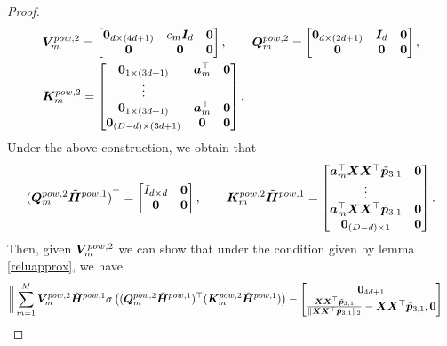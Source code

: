 \begin{proof}
    \begin{align*}
        &\boldsymbol{V}_{m}^{pow,2}=\begin{bmatrix}
            \boldsymbol{0}_{d\times (4d+1)}&c_m\boldsymbol{I}_d&\boldsymbol{0}\\
            \boldsymbol{0}&\boldsymbol{0}&\boldsymbol{0}
        \end{bmatrix},\qquad\boldsymbol{Q}_{m}^{pow,2}=\begin{bmatrix}
            \boldsymbol{0}_{d\times(2d+1)}&\boldsymbol{I}_{d}&\boldsymbol{0}\\
            \boldsymbol{0}&\boldsymbol{0}&\boldsymbol{0}
        \end{bmatrix},\\
        &\boldsymbol{K}_m^{pow,2}=\begin{bmatrix}
            \boldsymbol{0}_{1\times (3d+1)}&\boldsymbol{a}_m^\top&\boldsymbol{0}\\
            \vdots\\
            \boldsymbol{0}_{1\times(3d+1)}&\boldsymbol{a}_m^\top&\boldsymbol{0}\\
            \boldsymbol{0}_{(D-d)\times(3d+1)}&\boldsymbol{0}&\boldsymbol{0}
        \end{bmatrix}.
    \end{align*}
    Under the above construction, we obtain that
    \begin{align*}
        (\boldsymbol{Q}_m^{pow,2}\tilde{\boldsymbol{H}}^{pow,1})^\top =\begin{bmatrix}
            I_{d\times d}&\boldsymbol{0}\\
            \boldsymbol{0}&\boldsymbol{0}
        \end{bmatrix},\qquad \boldsymbol{K}_m^{pow,2}\tilde{\boldsymbol{H}}^{pow,1} = \begin{bmatrix}
            \boldsymbol{a}_m^\top\boldsymbol{X}\boldsymbol{X}^\top\tilde{\boldsymbol{p}}_{3,1}&\boldsymbol{0}\\
            \vdots\\
            \boldsymbol{a}_m^\top\boldsymbol{X}\boldsymbol{X}^\top\tilde{\boldsymbol{p}}_{3,1}&\boldsymbol{0}\\
            \boldsymbol{0}_{(D-d)\times 1}&\boldsymbol{0}
        \end{bmatrix}.
    \end{align*}
    Then, given $\boldsymbol{V}_m^{pow,2}$ we can show that under the condition given by lemma \ref{reluapprox}, we have
    \begin{align*}
        \bigg\Vert&\sum_{m=1}^M\boldsymbol{V}_m^{pow,2}\tilde{\boldsymbol{H}}^{pow,1}\sigma\left((\boldsymbol{Q}_m^{pow,2}\tilde{\boldsymbol{H}}^{pow,1})^\top(\boldsymbol{K}_m^{pow,2}\tilde{\boldsymbol{H}}^{pow,1})\right)-\begin{bmatrix}
        \boldsymbol{0}_{4d+1}\\
            \frac{\boldsymbol{X}\boldsymbol{X}^\top\tilde{\boldsymbol{p}}_{3,1}}{\Vert\boldsymbol{X}\boldsymbol{X}^\top\tilde{\boldsymbol{p}}_{3,1}\Vert_2}-\boldsymbol{X}\boldsymbol{X}^\top\tilde{\boldsymbol{p}}_{3,1},\boldsymbol{0}\\

\end{bmatrix}
\end{align*}
\end{proof}
